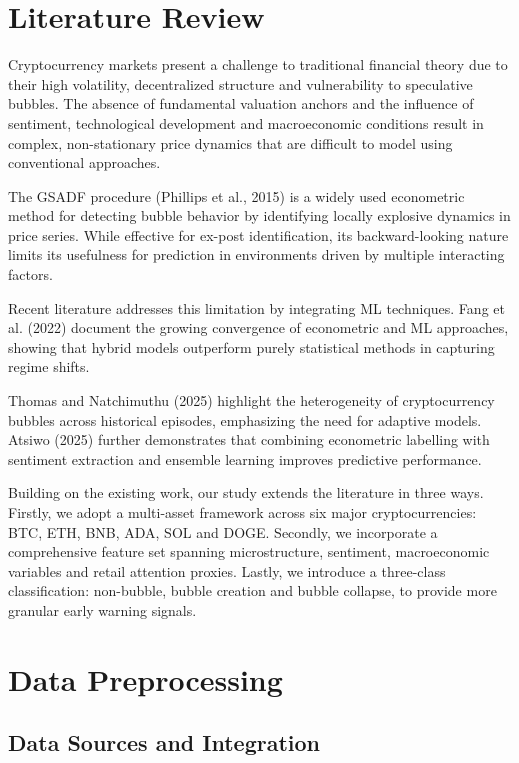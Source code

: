 \documentclass[12pt,a4paper]{article}
\begin{document}
\section{Literature Review}

Cryptocurrency markets present a challenge to traditional financial theory due to their high volatility, decentralized structure and vulnerability to speculative bubbles. The absence of fundamental valuation anchors and the influence of sentiment, technological development and macroeconomic conditions result in complex, non-stationary price dynamics that are difficult to model using conventional approaches. 

The GSADF procedure (Phillips et al., 2015) is a widely used econometric method for detecting bubble behavior by identifying locally explosive dynamics in price series. While effective for ex-post identification, its backward-looking nature limits its usefulness for prediction in environments driven by multiple interacting factors. 

Recent literature addresses this limitation by integrating ML techniques. Fang et al. (2022) document the growing convergence of econometric and ML approaches, showing that hybrid models outperform purely statistical methods in capturing regime shifts. 

Thomas and Natchimuthu (2025) highlight the heterogeneity of cryptocurrency bubbles across historical episodes, emphasizing the need for adaptive models. Atsiwo (2025) further demonstrates that combining econometric labelling with sentiment extraction and ensemble learning improves predictive performance. 

Building on the existing work, our study extends the literature in three ways. Firstly, we adopt a multi-asset framework across six major cryptocurrencies: BTC, ETH, BNB, ADA, SOL and DOGE. Secondly, we incorporate a comprehensive feature set spanning microstructure, sentiment, macroeconomic variables and retail attention proxies. Lastly, we introduce a three-class classification: non-bubble, bubble creation and bubble collapse, to provide more granular early warning signals.


\section{Data Preprocessing}
\subsection{Data Sources and Integration}
 
\end{document}
